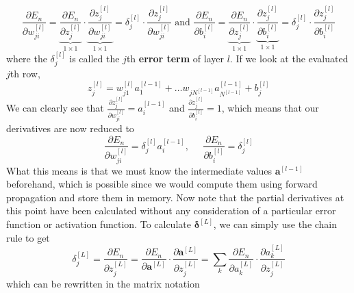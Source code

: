 \begin{algo}[Backpropagation]
    \begin{equation}
      \frac{\partial E_n}{\partial w_{ji}^{[l]}} = \underbrace{\frac{\partial E_n}{\partial z^{[l]}_j}}_{1 \times 1} \cdot \underbrace{\frac{\partial z^{[l]}_j}{\partial w_{ji}^{[l]}}}_{1 \times 1} = \delta^{[l]}_j \cdot \frac{\partial z^{[l]}_j}{\partial w_{ji}^{[l]}} \text{ and } \frac{\partial E_n}{\partial b_{i}^{[l]}} = \underbrace{\frac{\partial E_n}{\partial z^{[l]}_j}}_{1 \times 1} \cdot \underbrace{\frac{\partial z^{[l]}_j}{\partial b_{i}^{[l]}}}_{1 \times 1} = \delta^{[l]}_j \cdot \frac{\partial z^{[l]}_j}{\partial b_{i}^{[l]}}
    \end{equation}
    where the $\delta_j^{[l]}$ is called the $j$th \textbf{error term} of layer $l$. If we look at the evaluated $j$th row, 
    \begin{equation}
      z_j^{[l]} = w_{j1}^{[l]} a_1^{[l-1]} + \ldots w_{j N^{[l-1]}} a^{[l-1]}_{N^{[l-1]}} + b_j^{[l]}
    \end{equation}
    We can clearly see that $\frac{\partial z^{[l]}_j}{\partial w_{ji}^{[l]}} = a_i^{[l-1]}$ and $\frac{\partial z^{[l]}_j}{\partial b_{i}^{[l]}} = 1$, which means that our derivatives are now reduced to 
    \begin{equation}
      \frac{\partial E_n}{\partial w_{ji}^{[l]}} = \delta_j^{[l]} a_i^{[l-1]}, \;\;\;\;\; \frac{\partial E_n}{\partial b_{i}^{[l]}} = \delta_j^{[l]}
    \end{equation}
    What this means is that we must know the intermediate values $\mathbf{a}^{[l-1]}$ beforehand, which is possible since we would compute them using forward propagation and store them in memory. Now note that the partial derivatives at this point have been calculated without any consideration of a particular error function or activation function. To calculate $\boldsymbol{\delta}^{[L]}$, we can simply use the chain rule to get 
    \begin{equation}
      \delta_j^{[L]} = \frac{\partial E_n}{\partial z_j^{[L]}} = \frac{\partial E_n}{\partial \mathbf{a}^{[L]}} \cdot \frac{\partial \mathbf{a}^{[L]}}{\partial z_j^{[L]}} = \sum_k \frac{\partial E_n}{\partial a_k^{[L]}} \cdot \frac{\partial a_k^{[L]}}{\partial z_j^{[L]}}
    \end{equation}
    which can be rewritten in the matrix notation
    \begin{equation}

\end{equation}
\end{algo}
